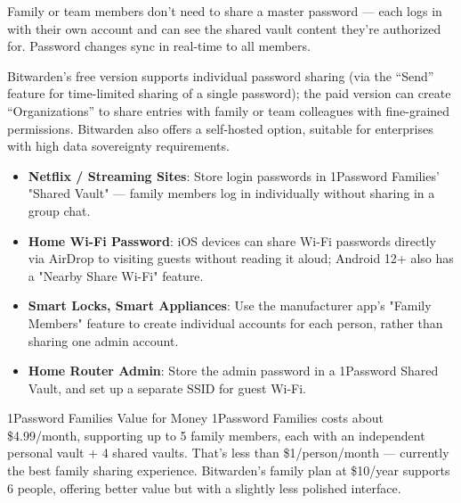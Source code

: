 Family or team members don't need to share a master password — each logs in with their own account and can see the shared vault content they're authorized for. Password changes sync in real-time to all members.


Bitwarden's free version supports individual password sharing (via the “Send” feature for time-limited sharing of a single password); the paid version can create “Organizations” to share entries with family or team colleagues with fine-grained permissions. Bitwarden also offers a self-hosted option, suitable for enterprises with high data sovereignty requirements.


\begin{itemize}
  \item \textbf{Netflix / Streaming Sites}: Store login passwords in 1Password Families' "Shared Vault" — family members log in individually without sharing in a group chat.
  \item \textbf{Home Wi-Fi Password}: iOS devices can share Wi-Fi passwords directly via AirDrop to visiting guests without reading it aloud; Android 12+ also has a "Nearby Share Wi-Fi" feature.
  \item \textbf{Smart Locks, Smart Appliances}: Use the manufacturer app's "Family Members" feature to create individual accounts for each person, rather than sharing one admin account.
  \item \textbf{Home Router Admin}: Store the admin password in a 1Password Shared Vault, and set up a separate SSID for guest Wi-Fi.
\end{itemize}

\begin{tcbinfo}{1Password Families Value for Money}
1Password Families costs about \$4.99/month, supporting up to 5 family members, each with an independent personal vault + 4 shared vaults. That's less than \$1/person/month — currently the best family sharing experience. Bitwarden's family plan at \$10/year supports 6 people, offering better value but with a slightly less polished interface.

\end{tcbinfo}


